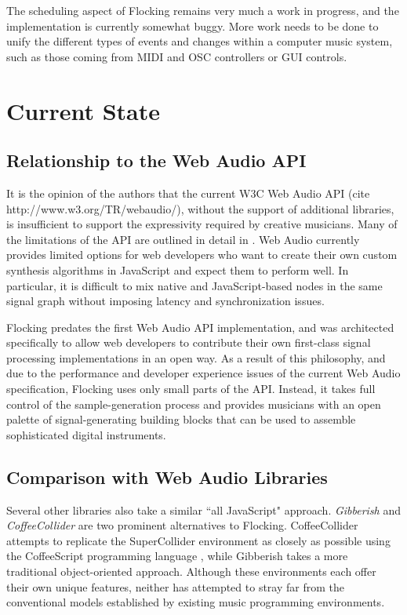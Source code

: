 \documentclass{article}
\begin{document}
The scheduling aspect of Flocking remains very much a work in progress, and the implementation is currently somewhat buggy. More work needs to be done to unify the different types of events and changes within a computer music system, such as those coming from MIDI and OSC controllers or GUI controls. 

\section{Current State}

\subsection{Relationship to the Web Audio API}

It is the opinion of the authors that the current W3C Web Audio API (cite http://www.w3.org/TR/webaudio/), without the support of additional libraries, is insufficient to support the expressivity required by creative musicians. Many of the limitations of the API are outlined in detail in \cite{DBLP:journals/comj/WyseS13}. Web Audio currently provides limited options for web developers who want to create their own custom synthesis algorithms in JavaScript and expect them to perform well. In particular, it is difficult to mix native and JavaScript-based nodes in the same signal graph without imposing latency and synchronization issues.

Flocking predates the first Web Audio API implementation, and was architected specifically to allow web developers to contribute their own first-class signal processing implementations in an open way. As a result of this philosophy, and due to the performance and developer experience issues of the current Web Audio specification, Flocking uses only small parts of the API. Instead, it takes full control of the sample-generation process and provides musicians with an open palette of signal-generating building blocks that can be used to assemble sophisticated digital instruments.

\subsection{Comparison with Web Audio Libraries}

Several other libraries also take a similar ``all JavaScript" approach. {\it Gibberish} \cite{roberts_web_2013} and {\it CoffeeCollider} \cite{Mohayonao} are two prominent alternatives to Flocking. CoffeeCollider attempts to replicate the SuperCollider environment as closely as possible using the CoffeeScript programming language \cite{Ashkenas}, while Gibberish takes a more traditional object-oriented approach. Although these environments each offer their own unique features, neither has attempted to stray far from the conventional models established by existing music programming environments.
\end{document}
